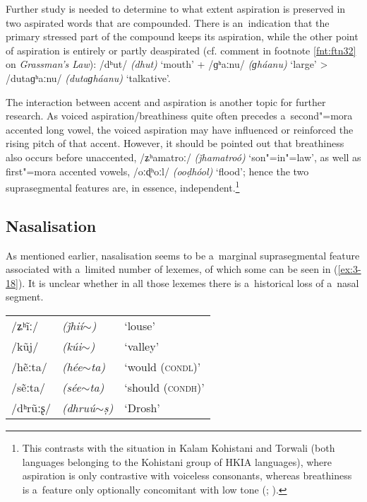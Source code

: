 Further study is needed to determine to what extent aspiration is preserved in two aspirated words that are compounded. There is an~indication that the primary stressed part of the compound keeps its aspiration, while the other point of aspiration is entirely or partly deaspirated (cf. comment in footnote \ref{fnt:ftn32} on \textit{Grassman's Law}): /dʰut/ \textit{(dhut)} `mouth' + /ɡʰaːnu/ \textit{(ɡháanu)} `large' {\textgreater} /dutaɡʰaːnu/ \textit{(dutaɡháanu)} `talkative'.


The interaction between accent and aspiration is another topic for further research. As voiced aspiration/breathiness quite often precedes a~second"=mora accented long vowel, the voiced aspiration may have influenced or reinforced the rising pitch of that accent. However, it should be pointed out that breathiness also occurs before unaccented, /ʑʰamatroː/ \textit{(ǰhamatroó)} `son"=in"=law', as well as first"=mora accented vowels, /oːɖʰoːl/ \textit{(ooḍhóol)} `flood'; hence the two suprasegmental features are, in essence, independent.\footnote{This contrasts with the situation in Kalam Kohistani and Torwali (both languages belonging to the Kohistani group of HKIA languages), where aspiration is only contrastive with voiceless consonants, whereas breathiness is a~feature only optionally concomitant with low tone (\citealt[92]{baart1999b}; \citealt[36--37]{lunsford2001}). } 


\subsection{Nasalisation}
\label{subsec:3-4-2}


As mentioned earlier, nasalisation seems to be a~marginal suprasegmental feature associated with a~limited number of lexemes, of which some can be seen in (\ref{ex:3-18}). It is unclear whether in all those lexemes there is a~historical loss of a~nasal segment.


\begin{exe}
\extab
\label{ex:3-18}
\begin{tabularx}{\textwidth}{ l l l }
/ʑʰ\~{i}ː/ &
\textit{(ǰhií$\sim$) } &
`louse'\\
/kũj/ &
\textit{(kúi$\sim$)} &
`valley'\\
/hẽːta/ &
\textit{(hée$\sim$ta)} &
`would (\textsc{condl)}'\\
/sẽːta/ &
\textit{(sée$\sim$ta)} &
`should (\textsc{condh)}'\\
/dʰrũːʂ/ &
\textit{(dhruú$\sim$ṣ)} &
`Drosh'\\
\end{tabularx}
\end{exe}


